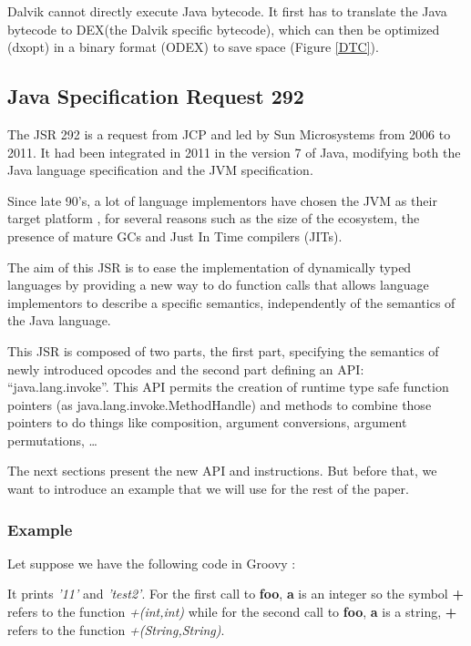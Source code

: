 \documentclass{sig-alternate}
\def \JCP{JCP\xspace}
\def \SUN{Sun Microsystems\xspace}
\def \DALVIK{Dalvik\xspace}
\def \Jsr{JSR\xspace}
\def \JSR{\Jsr 292\xspace}
\def \JVM{JVM\xspace}
\def \DEX{DEX\xspace}
\begin{document}
      \DALVIK cannot directly execute Java bytecode.
      It first has to translate the Java bytecode to \DEX (the \DALVIK specific bytecode),
      which can then be optimized (dxopt) in a binary format (\mbox{ODEX}) to save space (Figure \ref{DTC}).

  \subsection{Java Specification Request 292}

    The \JSR is a request from \JCP and led by \SUN from 2006 to 2011.
    It had been integrated in 2011 in the version 7 of Java,
    modifying both the Java language specification and the \JVM specification.

    Since late 90's, a lot of language
    implementors have chosen the JVM as their target platform \cite{wiki-jvm-lang},
    for several reasons such as the size of the ecosystem,
    the presence of mature GCs and Just In Time compilers (JITs).

    The aim of this \Jsr is to ease the implementation of dynamically typed languages
    by providing a new way to do function calls that allows language implementors
    to describe a specific semantics, independently of the semantics of the Java language.

    This \Jsr is composed of two parts, the first part, specifying the semantics of
    newly introduced opcodes and the second part defining an API: ``java.lang.invoke''.
    This API permits the creation of runtime type safe function pointers (as java.lang.invoke.MethodHandle)
    and methods to combine those pointers to do things like composition, argument conversions,
    argument permutations, \dots

    The next sections present the new API and instructions.
    But before that, we want to introduce an example that we will use for the rest of the paper.

    \subsubsection{Example}
      Let suppose we have the following code in Groovy \cite{lang-groovy}:

      

      It prints {\it '11'} and {\it 'test2'}.
      For the first call to {\bf foo}, {\bf a} is an integer so the symbol {\bf +} refers
      to the function {\it +(int,int)} while for the second call to {\bf foo}, {\bf a} is a string, {\bf +} refers to the function {\it +(String,String)}.
\end{document}
